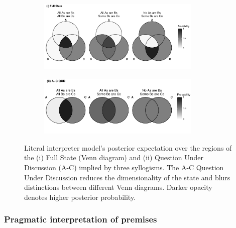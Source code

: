 \documentclass[floatsintext, doc]{apa6}
\begin{document}
\begin{figure}[b]
    \centering
    \begin{subfigure}[t]{\textwidth}
        \centering
        \includegraphics[width = 0.85\textwidth]{figs/venn_literal_AA1_AI1_EI1_exp.pdf}
    \end{subfigure}
    
    \begin{subfigure}[t]{\textwidth}
        \centering
        \includegraphics[width = 0.85\textwidth]{figs/venn_literal_AA1_AI1_EI1_exp_qud.pdf}
    \end{subfigure}
    \caption{\small Literal interpreter model's posterior expectation over the regions of the (i) Full State (Venn diagram) and (ii) Question Under Discussion (A-C) implied by three syllogisms. The A-C Question Under Discussion reduces the dimensionality of the state and blurs distinctions between different Venn diagrams. Darker opacity denotes higher posterior probability.}
    \label{fig:lit_state_qud}
\end{figure}



\subsubsection{Pragmatic interpretation of premises}
\end{document}

